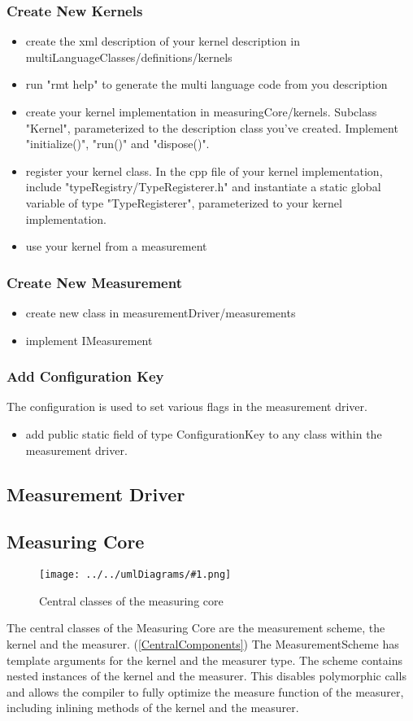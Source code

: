 \documentclass[a4paper,12pt]{article}
\newcommand{\umlDiagram}[1]{\begin{center}\texttt{[image: ../../umlDiagrams/\#1.png]}\end{center}}
\newcommand{\umlFloat}[2]{
\begin{figure}[tbh]
\umlDiagram{#1}
\caption{#2}
\label{#1}
\end{figure}
}
\newcommand{\umlRef}[1]{\autoref{#1}}
\begin{document}
\subsubsection{Create New Kernels}
\begin{itemize}
\item create the xml description of your kernel description in multiLanguageClasses/definitions/kernels
\item run "rmt help" to generate the multi language code from you description
\item create your kernel implementation in measuringCore/kernels. Subclass "Kernel", parameterized to the description class you've created. Implement "initialize()", "run()" and "dispose()".
\item register your kernel class. In the cpp file of your kernel implementation, include "typeRegistry/TypeRegisterer.h" and instantiate a static global variable of type "TypeRegisterer", parameterized to your kernel implementation.
\item use your kernel from a measurement
\end{itemize}

\subsubsection{Create New Measurement}
\begin{itemize}
\item create new class in measurementDriver/measurements
\item implement IMeasurement
\end{itemize}

\subsubsection{Add Configuration Key}
The configuration is used to set various flags in the measurement driver.
\begin{itemize}
\item add public static field of type ConfigurationKey to any class within the measurement driver.
\end{itemize}

\subsection{Measurement Driver}

\subsection{Measuring Core}
\umlFloat{CentralClasses}{Central classes of the measuring core}
The central classes of the Measuring Core are the measurement scheme, the kernel and the measurer. (\umlRef{CentralComponents}) The MeasurementScheme has template arguments for the kernel and the measurer type. The scheme contains nested instances of the kernel and the measurer. This disables polymorphic calls and allows the compiler to fully optimize the measure function of the measurer, including inlining methods of the kernel and the measurer.
\end{document}
